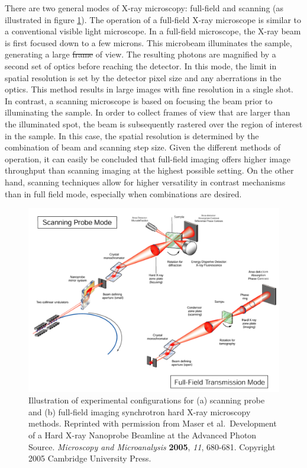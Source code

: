 \documentclass[journal=cmatex,manuscript=perspective]{achemso}
\providecommand{\DIFaddtex}[1]{{\protect\color{blue}\uwave{#1}}} %
\providecommand{\DIFdeltex}[1]{{\protect\color{red}\sout{#1}}}                      %
\providecommand{\DIFaddbegin}{} %
\providecommand{\DIFaddend}{} %
\providecommand{\DIFdelbegin}{} %
\providecommand{\DIFdelend}{} %
\providecommand{\DIFadd}[1]{\texorpdfstring{\DIFaddtex{#1}}{#1}} %
\providecommand{\DIFdel}[1]{\texorpdfstring{\DIFdeltex{#1}}{}} %
\begin{document}
There are two general modes of X-ray microscopy: full-field and
scanning (as illustrated in figure \ref{figure:maser2005}). The
operation of a full-field X-ray microscope is similar to a
conventional visible light microscope. In a full-field microscope, the
X-ray beam is first focused down to a few microns. This microbeam
illuminates the sample, generating a large \DIFdelbegin \DIFdel{frame }\DIFdelend \DIFaddbegin \DIFadd{field }\DIFaddend of view. The
resulting photons are magnified by a second set of optics before
reaching the detector.  In this mode, the limit in spatial resolution
is set by the detector pixel size and any aberrations in the
optics. This method results in large images with fine resolution in a
single shot. In contrast, a scanning microscope is based on focusing
the beam prior to illuminating the sample.  In order to collect frames
of view that are larger than the illuminated spot, the beam is
subsequently rastered over the region of interest in the sample. In
this case, the spatial resolution is determined by the combination of
beam and scanning step size. Given the different methods of operation,
it can easily be concluded that full-field imaging offers higher image
throughput than scanning imaging at the highest possible setting. On
the other hand, scanning techniques allow for higher versatility in
contrast mechanisms than in full field mode, especially when
combinations are desired.

\begin{figure}
  \includegraphics[width=\textwidth]{maser2005.png}
  \caption{Illustration of experimental configurations for (a)
    scanning probe and (b) full-field imaging synchrotron hard X-ray
    microscopy methods. Reprinted with permission from Maser et
    al.\ Development of a Hard X-ray Nanoprobe Beamline at the Advanced
    Photon Source. \textit{Microscopy and Microanalysis}
    \textbf{2005}, \textit{11}, 680-681. Copyright 2005 Cambridge
    University Press.}
  \label{figure:maser2005}
\end{figure}
\end{document}
